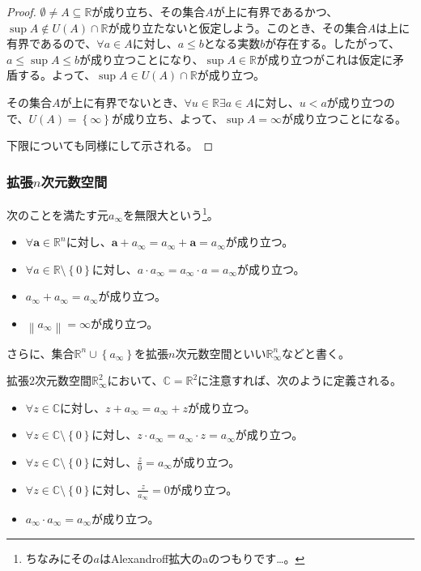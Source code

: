 \documentclass[dvipdfmx]{jsarticle}
\begin{document}
\begin{proof}
$\emptyset \neq A \subseteq \mathbb{R}$が成り立ち、その集合$A$が上に有界であるかつ、$\sup A \notin U(A) \cap \mathbb{R}$が成り立たないと仮定しよう。このとき、その集合$A$は上に有界であるので、$\forall a \in A$に対し、$a \leq b$となる実数$b$が存在する。したがって、$a \leq \sup A \leq b$が成り立つことになり、$\sup A \in \mathbb{R}$が成り立つがこれは仮定に矛盾する。よって、$\sup A \in U(A) \cap \mathbb{R}$が成り立つ。\par
その集合$A$が上に有界でないとき、$\forall u \in \mathbb{R}\exists a \in A$に対し、$u < a$が成り立つので、$U(A) = \left\{ \infty \right\}$が成り立ち、よって、$\sup A = \infty$が成り立つことになる。\par
下限についても同様にして示される。
\end{proof}
\subsubsection{拡張$n$次元数空間}%
\begin{axs} 次のことを満たす元$a_{\infty}$を無限大という\footnote{ちなみにその$a$はAlexandroff拡大のaのつもりです…。}。
\begin{itemize}
\item
  $\forall\mathbf{a} \in \mathbb{R}^{n}$に対し、$\mathbf{a} + a_{\infty} = a_{\infty} + \mathbf{a} = a_{\infty}$が成り立つ。
\item
  $\forall a \in \mathbb{R} \setminus \left\{ 0 \right\}$に対し、$a \cdot a_{\infty} = a_{\infty} \cdot a = a_{\infty}$が成り立つ。
\item
  $a_{\infty} + a_{\infty} = a_{\infty}$が成り立つ。
\item
  $\left\| a_{\infty} \right\| = \infty$が成り立つ。
\end{itemize}
さらに、集合$\mathbb{R}^{n} \cup \left\{ a_{\infty} \right\}$を拡張$n$次元数空間といい$\mathbb{R}_{\infty}^{n}$などと書く。
\end{axs}
\begin{axs}
拡張$2$次元数空間$\mathbb{R}_{\infty}^{2}$において、$\mathbb{C} = \mathbb{R}^{2}$に注意すれば、次のように定義される。
\begin{itemize}
\item
  $\forall z \in \mathbb{C}$に対し、$z + a_{\infty} = a_{\infty} + z$が成り立つ。
\item
  $\forall z \in \mathbb{C} \setminus \left\{ 0 \right\}$に対し、$z \cdot a_{\infty} = a_{\infty} \cdot z = a_{\infty}$が成り立つ。
\item
  $\forall z \in \mathbb{C} \setminus \left\{ 0 \right\}$に対し、$\frac{z}{0} = a_{\infty}$が成り立つ。
\item
  $\forall z \in \mathbb{C} \setminus \left\{ 0 \right\}$に対し、$\frac{z}{a_{\infty}} = 0$が成り立つ。
\item
  $a_{\infty} \cdot a_{\infty} = a_{\infty}$が成り立つ。
\end{itemize}
\end{axs}
\end{document}
